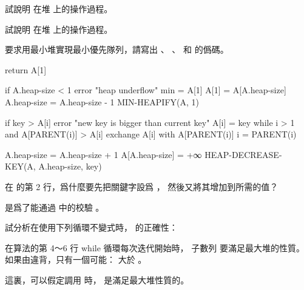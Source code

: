 \startsection[
  title={Priority queues},
]

\startEXERCISE
試說明  在堆  上的操作過程。
\stopEXERCISE

\startANSWER
\startcombination[2*2]
{\externalfigure[output/e6_5_1-1]}{}
{\externalfigure[output/e6_5_1-2]}{}
{\externalfigure[output/e6_5_1-3]}{}
\stopcombination
\stopANSWER

\startEXERCISE
試說明  在堆  上的操作過程。
\stopEXERCISE

\startANSWER
\startcombination[2*2]
{\externalfigure[output/e6_5_2-1]}{}
{\externalfigure[output/e6_5_2-2]}{}
{\externalfigure[output/e6_5_2-3]}{}
\stopcombination
\stopANSWER

\startEXERCISE
要求用最小堆實現最小優先隊列，請寫出 、 、
  和  的僞碼。
\stopEXERCISE

\startANSWER
{}
\startCLRS
return A[1]
\stopCLRS

\startCLRS
if A.heap-size < 1
	error "heap underflow"
min = A[1]
A[1] = A[A.heap-size]
A.heap-size = A.heap-size - 1
MIN-HEAPIFY(A, 1)
\stopCLRS

\startCLRS
if key > A[i]
	error "new key is bigger than current key"
A[i] = key
while i > 1 and A[PARENT(i)] > A[i]
	exchange A[i] with A[PARENT(i)]
	i = PARENT(i)
\stopCLRS

\startCLRS
A.heap-size = A.heap-size + 1
A[A.heap-size] = +∞
HEAP-DECREASE-KEY(A, A.heap-size, key)
\stopCLRS
\stopANSWER

\startEXERCISE
在  的第 2 行，爲什麼要先把關鍵字設爲 \m{-\infty}，
然後又將其增加到所需的值？
\stopEXERCISE

\startANSWER
是爲了能通過  中的校驗 。
\stopANSWER

\startEXERCISE
試分析在使用下列循環不變式時，  的正確性：

在算法的第 4～6 行 {\EMP while} 循環每次迭代開始時，
子數列  要滿足最大堆的性質。
如果由違背，只有一個可能：  大於 。

這裏，可以假定調用  時，  是滿足最大堆性質的。
\stopEXERCISE

